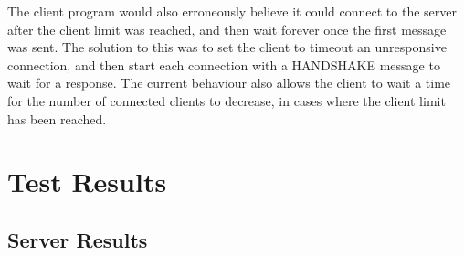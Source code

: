 \documentclass{article}
\begin{document}
The client program would also erroneously believe it could connect to the server after the client limit was reached, and then wait forever once the first message was sent. The solution to this was to set the client to timeout an unresponsive connection, and then start each connection with a HANDSHAKE message to wait for a response. The current behaviour also allows the client to wait a time for the number of connected clients to decrease, in cases where the client limit has been reached.  

\section{Test Results}
\subsection{Server Results}
\end{document}
